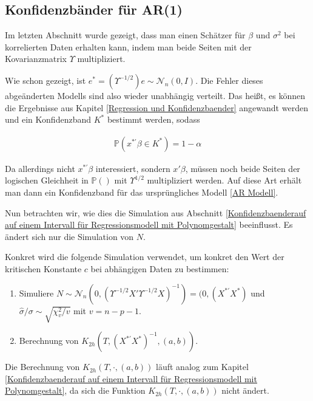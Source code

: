 \documentclass[12pt,a4paper]{article}
\theoremstyle{definition}
\theoremstyle{definition}
\theoremstyle{definition}
\theoremstyle{definition}
\begin{document}
\subsection{Konfidenzbänder für AR(1)}
\label{Konfidenzbaender für AR(1)}
Im letzten Abschnitt wurde gezeigt, dass man einen Schätzer für $\beta$ und $\sigma^2$ bei korrelierten Daten erhalten kann, indem man beide Seiten mit der Kovarianzmatrix $\Upsilon$ multipliziert. 

Wie schon gezeigt, ist $e^{*} = (\Upsilon^{-1/2})e \sim \mathscr{N}_{n}(0,I)$. Die Fehler dieses abgeänderten Modells sind also wieder unabhängig verteilt. Das heißt, es können die Ergebnisse aus Kapitel \ref{Regression und Konfidenzbaender} angewandt werden und ein Konfidenzband $K^{*}$ bestimmt werden, sodass

\begin{align*}
\mathbb{P}(x^{*'} \beta \in K^{*}) = 1 - \alpha
\end{align*}

Da allerdings nicht $x^{*'} \beta$ interessiert, sondern $x' \beta$, müssen noch beide Seiten der logischen Gleichheit in $\mathbb{P}()$ mit $\Upsilon^{1/2}$ multipliziert werden. Auf diese Art erhält man dann ein Konfidenzband für das ursprüngliches Modell \eqref{AR Modell}.

Nun betrachten wir, wie dies die Simulation aus Abschnitt \ref{Konfidenzbaenderauf auf einem Intervall für Regressionsmodell mit Polynomgestalt} beeinflusst. Es ändert sich nur die Simulation von $N$.

Konkret wird die folgende Simulation verwendet, um konkret den Wert der kritischen Konstante $c$ bei abhängigen Daten zu bestimmen:

\begin{enumerate}
\item Simuliere $N \sim \mathscr{N}_{n}(0,(\Upsilon^{-1/2}X'\Upsilon^{-1/2}X)^{-1}) = (0,(X^{*'}X^{*})$ und $\hat{\sigma}/\sigma \sim \sqrt{\chi^2_v/v}$ mit $v=n-p-1$.
\item Berechnung von $K_{2h}(T,(X^{*'}X^{*})^{-1},(a,b))$.
\end{enumerate}

Die Berechnung von $K_{2h}(T,\cdot,(a,b))$ läuft analog zum Kapitel \ref{Konfidenzbaenderauf auf einem Intervall für Regressionsmodell mit Polynomgestalt}, da sich die Funktion $K_{2h}(T,\cdot,(a,b))$ nicht ändert.
\end{document}
